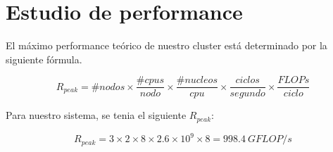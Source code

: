 \section{Estudio de performance}

El máximo performance teórico de nuestro cluster está determinado por la siguiente fórmula. 

\begin{equation} \label{eq:1}
	R_{peak} = \#nodos \times \frac{\#cpus}{nodo} \times \frac{\#nucleos}{cpu} \times \frac{ciclos}{segundo} \times \frac{FLOPs}{ciclo} 
\end{equation}

Para nuestro sistema, se tenia el siguiente $R_{peak}$:

\begin{equation} \label{rpeak_two_node}
	R_{peak} = 3 \times 2 \times 8 \times 2.6 \times 10^{9} \times 8 = 998.4\ {GFLOP}/s
\end{equation}